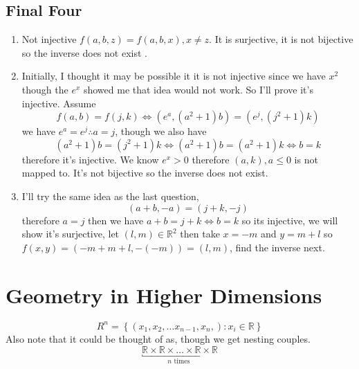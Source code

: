 \documentclass[11pt]{book}
\begin{document}
\subsection{Final Four}%
\label{sub:final_four}

\begin{enumerate}
    \item Not injective $f\left(a,b,z\right) = f\left(a,b,x\right) ,x\neq z $. It is surjective, it is not bijective so the inverse does not exist .
    \item Initially, I thought it may be possible it it is not injective since we have $x^2 $ though the $e^{x} $ showed me that idea would not work. So I'll prove it's injective. Assume 
        \[
            f\left(a,b\right) = f\left( j,k \right) \Leftrightarrow \left( e^{a} , \left( a^2  + 1 \right) b \right) = \left( e^{j} ,\left( j^2  + 1 \right) k \right) 
        \]
        we have $e^{a} = e^{j} \therefore a = j $, though we also have
        \[
            \left( a^2  + 1 \right) b = \left( j^2  + 1 \right) k \Leftrightarrow \left( a^2  + 1 \right) b= \left( a^2  + 1 \right) k \Leftrightarrow b= k
        \]
        therefore it's injective. We know $e^{x} > 0$ therefore $\left( a,k \right), a \le 0$ is not mapped to. It's not bijective so the inverse does not exist.
    \item I'll try the same idea as the last question, 
        \[
            \left( a + b,  - a \right) = \left( j + k,  - j \right) 
        \]
        therefore $a = j$ then we have $a + b= j + k \Leftrightarrow b= k$ so its injective, we will show it's surjective, let $\left( l,m \right) \in \mathbb{R} ^2 $ then take $x=  - m$ and $y= m + l$ so $f\left(x,y\right) = \left(  - m  + m + l,  - \left(  - m \right)  \right) = \left( l,m \right) $, find the inverse next.
\end{enumerate}


\section{Geometry in Higher Dimensions}%
\label{sec:geometry_in_higher_dimensions}

\begin{defn}[$R^{n} $ ]\label{defn:_r_n_}
    \[
        R^{n} = \left\{ \left( x_{1},  x_{2},  \dotsc   x_{n - 1},  x_{n},  \right): x_{i} \in \mathbb{R}   \right\} 
    \]
    Also note that it could be thought of as, though we get nesting couples.
    \[
        \underbracket{ \mathbb{R} \times \mathbb{R} \times \ldots \times \mathbb{R} \times \mathbb{R} }_{n \text{ times } }
    \]
\end{defn}
\end{document}
